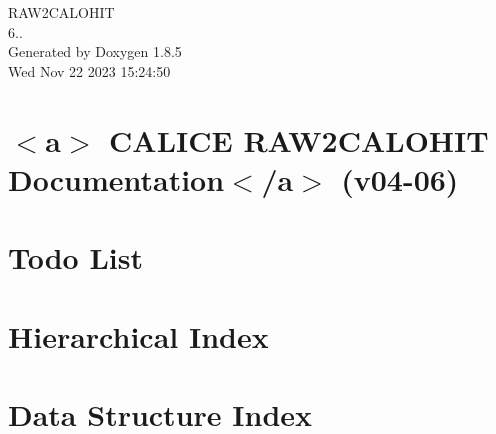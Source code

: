 \documentclass[twoside]{book}
\newcommand{\clearemptydoublepage}{%
  \newpage{\pagestyle{empty}\cleardoublepage}%
}
\begin{document}
\begin{titlepage}
\vspace*{7cm}
\begin{center}%
{\Large R\-A\-W2\-C\-A\-L\-O\-H\-I\-T \\[1ex]\large 6.. }\\
\vspace*{1cm}
{\large Generated by Doxygen 1.8.5}\\
\vspace*{0.5cm}
{\small Wed Nov 22 2023 15:24:50}\\
\end{center}
\end{titlepage}
\clearemptydoublepage
\tableofcontents
\clearemptydoublepage
{}

\chapter{$<$a$>$ C\-A\-L\-I\-C\-E R\-A\-W2\-C\-A\-L\-O\-H\-I\-T Documentation$<$/a$>$ (v04-\/06)}
\label{index}
\chapter{Todo List}
\label{todo}

\chapter{Hierarchical Index}

\chapter{Data Structure Index}

\end{document}
